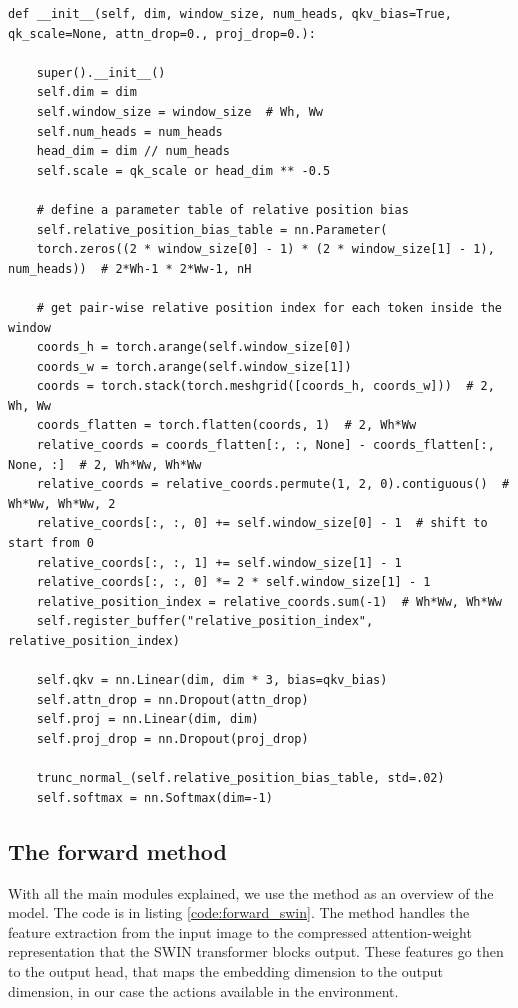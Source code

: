\begin{lstlisting}[caption={Window attention module constructor}, label={code:win_attention_constructor}]
	def __init__(self, dim, window_size, num_heads, qkv_bias=True, qk_scale=None, attn_drop=0., proj_drop=0.):
	
	super().__init__()
	self.dim = dim
	self.window_size = window_size  # Wh, Ww
	self.num_heads = num_heads
	head_dim = dim // num_heads
	self.scale = qk_scale or head_dim ** -0.5
	
	# define a parameter table of relative position bias
	self.relative_position_bias_table = nn.Parameter(
	torch.zeros((2 * window_size[0] - 1) * (2 * window_size[1] - 1), num_heads))  # 2*Wh-1 * 2*Ww-1, nH
	
	# get pair-wise relative position index for each token inside the window
	coords_h = torch.arange(self.window_size[0])
	coords_w = torch.arange(self.window_size[1])
	coords = torch.stack(torch.meshgrid([coords_h, coords_w]))  # 2, Wh, Ww
	coords_flatten = torch.flatten(coords, 1)  # 2, Wh*Ww
	relative_coords = coords_flatten[:, :, None] - coords_flatten[:, None, :]  # 2, Wh*Ww, Wh*Ww
	relative_coords = relative_coords.permute(1, 2, 0).contiguous()  # Wh*Ww, Wh*Ww, 2
	relative_coords[:, :, 0] += self.window_size[0] - 1  # shift to start from 0
	relative_coords[:, :, 1] += self.window_size[1] - 1
	relative_coords[:, :, 0] *= 2 * self.window_size[1] - 1
	relative_position_index = relative_coords.sum(-1)  # Wh*Ww, Wh*Ww
	self.register_buffer("relative_position_index", relative_position_index)
	
	self.qkv = nn.Linear(dim, dim * 3, bias=qkv_bias)
	self.attn_drop = nn.Dropout(attn_drop)
	self.proj = nn.Linear(dim, dim)
	self.proj_drop = nn.Dropout(proj_drop)
	
	trunc_normal_(self.relative_position_bias_table, std=.02)
	self.softmax = nn.Softmax(dim=-1)
\end{lstlisting}

\subsection{The forward method}

With all the main modules explained, we use the  method as an overview of the model. The code is in listing \ref{code:forward_swin}. The  method handles the feature extraction from the input image to the compressed attention-weight representation that the SWIN transformer blocks output. These features go then to the output head, that maps the embedding dimension to the output dimension, in our case the actions available in the environment.

